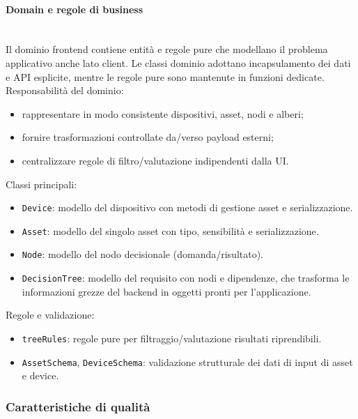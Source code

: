 \documentclass[a4paper,12pt]{article}
\begin{document}
            \paragraph{Domain e regole di business}\mbox{}\\
                Il dominio frontend contiene entità e regole pure che modellano il problema applicativo anche lato client. Le classi dominio adottano incapsulamento dei dati e API esplicite, mentre le regole pure sono mantenute in funzioni dedicate. \\
                Responsabilità del dominio:
                \begin{itemize}
                    \item rappresentare in modo consistente dispositivi, asset, nodi e alberi;
                    \item fornire trasformazioni controllate da/verso payload esterni;
                    \item centralizzare regole di filtro/valutazione indipendenti dalla UI.
                \end{itemize}
                Classi principali:
                \begin{itemize}
                    \item \texttt{Device}: modello del dispositivo con metodi di gestione asset e serializzazione.
                    \item \texttt{Asset}: modello del singolo asset con tipo, sensibilità e serializzazione.
                    \item \texttt{Node}: modello del nodo decisionale (domanda/risultato).
                    \item \texttt{DecisionTree}: modello del requisito con nodi e dipendenze, che trasforma le informazioni grezze del backend in oggetti pronti per l'applicazione.
                \end{itemize}
                
                Regole e validazione:
                \begin{itemize}
                    \item \texttt{treeRules}: regole pure per filtraggio/valutazione risultati riprendibili.
                    \item \texttt{AssetSchema}, \texttt{DeviceSchema}: validazione strutturale dei dati di input di asset e device.
                \end{itemize}
        
        \subsubsection{Caratteristiche di qualità}
\end{document}
